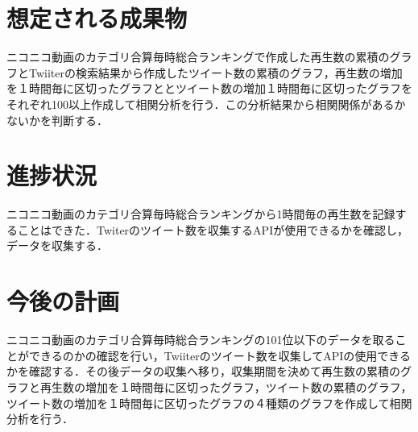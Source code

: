 \documentclass[uplatex,twocolumn,dvipdfmx]{jsarticle}
\begin{document}
\section{想定される成果物}
ニコニコ動画のカテゴリ合算毎時総合ランキングで作成した再生数の累積のグラフとTwiiterの検索結果から作成したツイート数の累積のグラフ，再生数の増加を１時間毎に区切ったグラフととツイート数の増加１時間毎に区切ったグラフをそれぞれ100以上作成して相関分析を行う．この分析結果から相関関係があるかないかを判断する．

\section{進捗状況}
ニコニコ動画のカテゴリ合算毎時総合ランキングから1時間毎の再生数を記録することはできた．Twiterのツイート数を収集するAPIが使用できるかを確認し，データを収集する．

\section{今後の計画}
ニコニコ動画のカテゴリ合算毎時総合ランキングの101位以下のデータを取ることができるのかの確認を行い，Twiiterのツイート数を収集してAPIの使用できるかを確認する．その後データの収集へ移り，収集期間を決めて再生数の累積のグラフと再生数の増加を１時間毎に区切ったグラフ，ツイート数の累積のグラフ，ツイート数の増加を１時間毎に区切ったグラフの４種類のグラフを作成して相関分析を行う．




\end{document}
